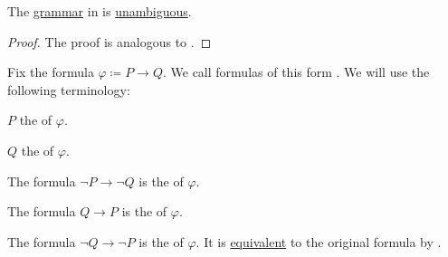\begin{proposition}\label{thm:propositional_formulas_are_unambiguous}
  The \hyperref[def:grammar]{grammar} in  is \hyperref[def:grammar_derivation/ambiguity]{unambiguous}.
\end{proposition}
\begin{proof}
  The proof is analogous to .
\end{proof}

\begin{definition}\label{def:material_implication}
  Fix the formula \( \varphi \coloneqq P \rightarrow Q \). We call formulas of this form . We will use the following terminology:

  \begin{DefEnum}
     \( P \) the  of \( \varphi \).

     \( Q \) the  of \( \varphi \).

     The formula \( \neg P \rightarrow \neg Q \) is the  of \( \varphi \).

     The formula \( Q \rightarrow P \) is the  of \( \varphi \).

     The formula \( \neg Q \rightarrow \neg P \) is the  of \( \varphi \). It is \hyperref[def:propositional_interpretation/equivalence]{equivalent} to the original formula by .
  \end{DefEnum}
\end{definition}

